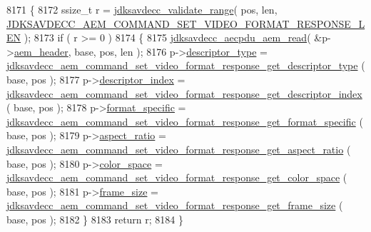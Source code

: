 \begin{DoxyCode}
8171 \{
8172     ssize\_t r = \hyperlink{group__util_ga9c02bdfe76c69163647c3196db7a73a1}{jdksavdecc\_validate\_range}( pos, len, 
      \hyperlink{group__command__set__video__format__response_gad774675e055c052cae2906bcadbad032}{JDKSAVDECC\_AEM\_COMMAND\_SET\_VIDEO\_FORMAT\_RESPONSE\_LEN} );
8173     \textcolor{keywordflow}{if} ( r >= 0 )
8174     \{
8175         \hyperlink{group__aecpdu__aem_gae2421015dcdce745b4f03832e12b4fb6}{jdksavdecc\_aecpdu\_aem\_read}( &p->\hyperlink{structjdksavdecc__aem__command__set__video__format__response_ae1e77ccb75ff5021ad923221eab38294}{aem\_header}, base, pos, len );
8176         p->\hyperlink{structjdksavdecc__aem__command__set__video__format__response_ab7c32b6c7131c13d4ea3b7ee2f09b78d}{descriptor\_type} = 
      \hyperlink{group__command__set__video__format__response_ga9ec3adb27f62132acb8e0f47caf819fc}{jdksavdecc\_aem\_command\_set\_video\_format\_response\_get\_descriptor\_type}
      ( base, pos );
8177         p->\hyperlink{structjdksavdecc__aem__command__set__video__format__response_a042bbc76d835b82d27c1932431ee38d4}{descriptor\_index} = 
      \hyperlink{group__command__set__video__format__response_gad21b9963ad9aec5db31d403a172be007}{jdksavdecc\_aem\_command\_set\_video\_format\_response\_get\_descriptor\_index}
      ( base, pos );
8178         p->\hyperlink{structjdksavdecc__aem__command__set__video__format__response_acbfc36b550978f88cf0a3d9d2b2ce0dd}{format\_specific} = 
      \hyperlink{group__command__set__video__format__response_gabb8dac5eaaecaf802a7ba404512629fb}{jdksavdecc\_aem\_command\_set\_video\_format\_response\_get\_format\_specific}
      ( base, pos );
8179         p->\hyperlink{structjdksavdecc__aem__command__set__video__format__response_aa2976b5991e88ce43c451d2683d5f329}{aspect\_ratio} = 
      \hyperlink{group__command__set__video__format__response_gaebc0d053b3ad2b15b2e2f6910591acbe}{jdksavdecc\_aem\_command\_set\_video\_format\_response\_get\_aspect\_ratio}
      ( base, pos );
8180         p->\hyperlink{structjdksavdecc__aem__command__set__video__format__response_a5f1234a863bb834ff7c110509884d228}{color\_space} = 
      \hyperlink{group__command__set__video__format__response_ga1f748dd4eec12b7c2a5f14a6d8bb5a44}{jdksavdecc\_aem\_command\_set\_video\_format\_response\_get\_color\_space}
      ( base, pos );
8181         p->\hyperlink{structjdksavdecc__aem__command__set__video__format__response_a0229abcfe4414f86dcf52c5ebf84311c}{frame\_size} = 
      \hyperlink{group__command__set__video__format__response_gaf9b9b9778a5a6c8c494596e02ba3e0c0}{jdksavdecc\_aem\_command\_set\_video\_format\_response\_get\_frame\_size}
      ( base, pos );
8182     \}
8183     \textcolor{keywordflow}{return} r;
8184 \}
\end{DoxyCode}


